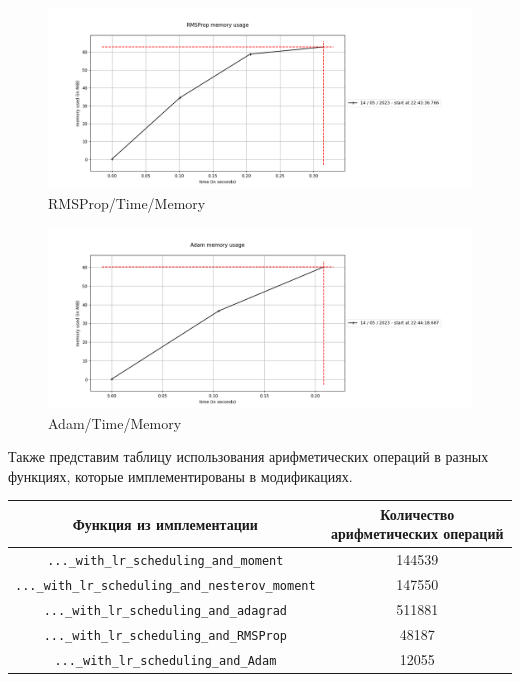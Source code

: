 \documentclass[12pt, a4paper, oneside, final]{article}
\begin{document}
	\begin{figure}[H]
	\centering
	\includegraphics[scale = 0.6]{Image/T4_RMS.png}
	\caption*{RMSProp/Time/Memory}
\end{figure}
	\begin{figure}[H]
	\centering
	\includegraphics[scale = 0.6]{Image/T4_ADAM.png}
	\caption*{Adam/Time/Memory}
\end{figure}
	Также представим таблицу использования арифметических операций в разных функциях, которые имплементированы в модификациях.
		\begin{table}[H]
		\centering
		\begin{tabular}{|c|c|}
			Функция из имплементации & Количество арифметических операций \\ \hline
			\texttt{...\_with\_lr\_scheduling\_and\_moment} & 144539 \\
			\texttt{...\_with\_lr\_scheduling\_and\_nesterov\_moment} & 147550 \\
			\texttt{...\_with\_lr\_scheduling\_and\_adagrad} & 511881 \\
			\texttt{...\_with\_lr\_scheduling\_and\_RMSProp} & 48187 \\
			\texttt{...\_with\_lr\_scheduling\_and\_Adam} & 12055
		\end{tabular}
	\end{table}\newpage
\end{document}
